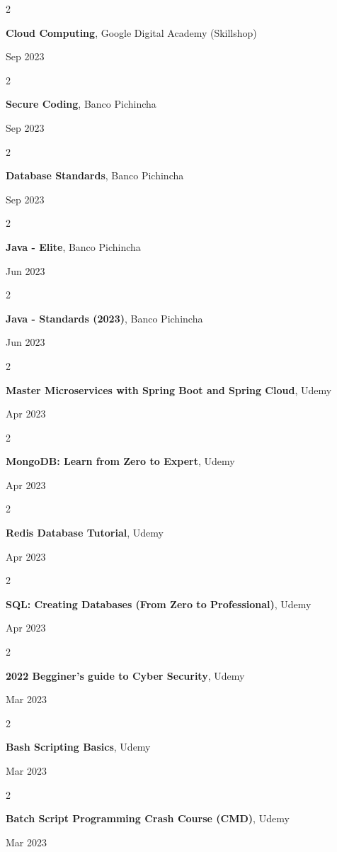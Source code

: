 \documentclass[10pt, letterpaper]{article}
\newenvironment{twocolentry}[2][]{
    \onecolentry
    \def\secondColumn{#2}
    \setcolumnwidth{\fill, 4.5 cm}
    \begin{paracol}{2}
}{
    \switchcolumn \raggedleft \secondColumn
    \end{paracol}
    \endonecolentry
} %
\begin{document}
    \begin{twocolentry}{
            Sep 2023
        }
        \textbf{Cloud Computing}, Google Digital Academy (Skillshop)
    \end{twocolentry}
    \begin{twocolentry}{
            Sep 2023
        }
        \textbf{Secure Coding}, Banco Pichincha
    \end{twocolentry}
    \begin{twocolentry}{
            Sep 2023
        }
        \textbf{Database Standards}, Banco Pichincha
    \end{twocolentry}
    \begin{twocolentry}{
            Jun 2023
        }
        \textbf{Java - Elite}, Banco Pichincha
    \end{twocolentry}
    \begin{twocolentry}{
            Jun 2023
        }
        \textbf{Java - Standards (2023)}, Banco Pichincha
    \end{twocolentry}
    \begin{twocolentry}{
            Apr 2023
        }
        \textbf{Master Microservices with Spring Boot and Spring Cloud}, Udemy
    \end{twocolentry}
    \begin{twocolentry}{
            Apr 2023
        }
        \textbf{MongoDB: Learn from Zero to Expert}, Udemy
    \end{twocolentry}
    \begin{twocolentry}{
            Apr 2023
        }
        \textbf{Redis Database Tutorial}, Udemy
    \end{twocolentry}
    \begin{twocolentry}{
            Apr 2023
        }
        \textbf{SQL: Creating Databases (From Zero to Professional)}, Udemy
    \end{twocolentry}
    \begin{twocolentry}{
            Mar 2023
        }
        \textbf{2022 Begginer’s guide to Cyber Security}, Udemy
    \end{twocolentry}
    \begin{twocolentry}{
            Mar 2023
        }
        \textbf{Bash Scripting Basics}, Udemy
    \end{twocolentry}
    \begin{twocolentry}{
            Mar 2023
        }
        \textbf{Batch Script Programming Crash Course (CMD)}, Udemy
    \end{twocolentry}
\end{document}
